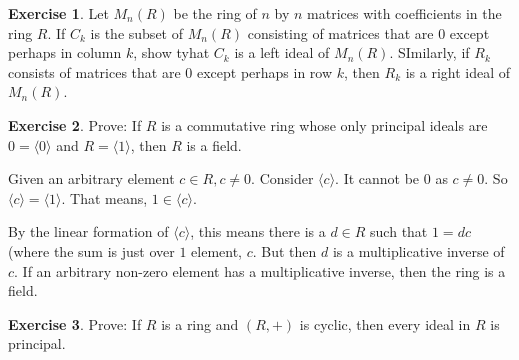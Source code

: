 \documentclass[11pt,oneside]{article}
\numberwithin{equation}{section}
\theoremstyle{definition}
\newtheorem{exercise}{Exercise}
\begin{document}
\begin{exercise}
  Let $M_n(R)$ be the ring of $n$ by $n$ matrices with coefficients
  in the ring $R$. If $C_k$ is the subset of $M_n(R)$ consisting of
  matrices that are $0$ except perhaps in column $k$, show tyhat
  $C_k$ is a left ideal of $M_n(R)$.  SImilarly, if $R_k$ consists
  of matrices that are $0$ except perhaps in row $k$, then $R_k$ is a
  right ideal of $M_n(R)$.  
\end{exercise}
\begin{solution}
\end{solution}
\begin{exercise}
  Prove: If $R$ is a commutative ring whose only principal ideals
  are ${0} = \langle 0 \rangle$ and $ R = \langle 1 \rangle$, then
  $R$ is a field.
\end{exercise}
\begin{solution}
  Given an arbitrary element $c \in R, c \neq 0$.
  Consider $\langle c \rangle$.  It cannot be ${0}$ as $c \neq 0$.
  So $\langle c \rangle = \langle 1 \rangle $.
  That means, $ 1 \in \langle c \rangle$.

  By the linear formation of $\langle c \rangle$, this means there is
  a $d \in R$ such that $1 = d c$ (where the sum is just over $1$
  element, $c$.  But then $d$ is a multiplicative inverse of $c$.  If
  an arbitrary non-zero element has a multiplicative inverse, then the
  ring is a field. 
  
  
\end{solution}
\begin{exercise}
  Prove: If $R$ is a ring and $(R, +)$ is cyclic, then every ideal in $R$ is principal.  
\end{exercise}
\end{document}
